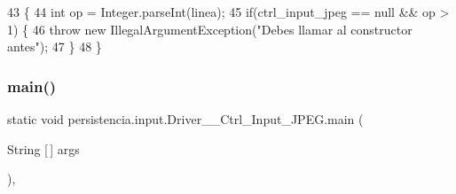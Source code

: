 \begin{DoxyCode}
43                                                                                           \{
44         \textcolor{keywordtype}{int} op = Integer.parseInt(linea);
45         \textcolor{keywordflow}{if}(ctrl\_input\_jpeg == null && op > 1) \{
46             \textcolor{keywordflow}{throw} \textcolor{keyword}{new} IllegalArgumentException(\textcolor{stringliteral}{"Debes llamar al constructor antes"});
47         \}
48     \}
\end{DoxyCode}
\mbox{\label{classpersistencia_1_1input_1_1Driver____Ctrl__Input__JPEG_ae46ec7babdaa3cf25854b21c693c4165}} 
\subsubsection{\texorpdfstring{main()}{main()}}
{\footnotesize\ttfamily static void persistencia.\+input.\+Driver\+\_\+\+\_\+\+Ctrl\+\_\+\+Input\+\_\+\+J\+P\+E\+G.\+main (\begin{DoxyParamCaption}\item[{String \mbox{[}$\,$\mbox{]}}]{args }\end{DoxyParamCaption})\hspace{0.3cm}{\ttfamily [inline]}, {\ttfamily [static]}}


